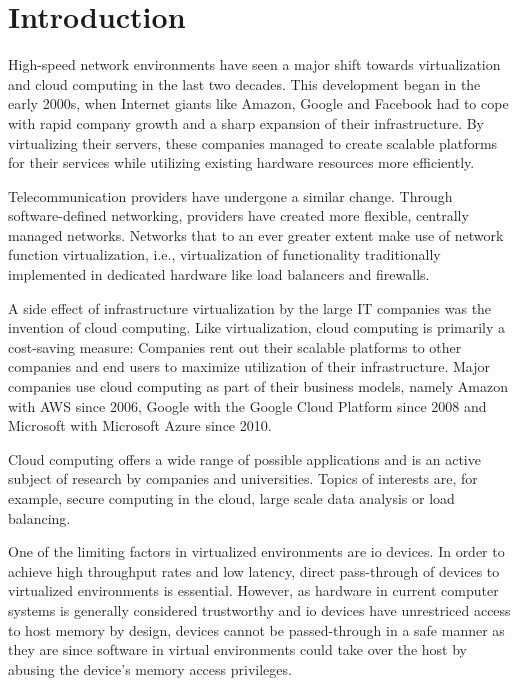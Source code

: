 \chapter{Introduction}
\label{chap:introduction}

High-speed network environments have seen a major shift towards virtualization
and cloud computing in the last two decades. This development began in the early
2000s, when Internet giants like Amazon, Google and Facebook had to cope with
rapid company growth and a sharp expansion of their infrastructure. By
virtualizing their servers, these companies managed to create scalable platforms
for their services while utilizing existing hardware resources more efficiently.

Telecommunication providers have undergone a similar change. Through
software-defined networking, providers have created more flexible, centrally
managed networks. Networks that to an ever greater extent make use of network
function virtualization, i.e., virtualization of functionality traditionally
implemented in dedicated hardware like load balancers and firewalls.

A side effect of infrastructure virtualization by the large IT companies was the
invention of cloud computing. Like virtualization, cloud computing is primarily
a cost-saving measure: Companies rent out their scalable platforms to other
companies and end users to maximize utilization of their infrastructure. Major
companies use cloud computing as part of their business models, namely Amazon
with AWS since 2006, Google with the Google Cloud Platform since 2008 and
Microsoft with Microsoft Azure since 2010.

Cloud computing offers a wide range of possible applications and is an active
subject of research by companies and universities. Topics of interests are, for
example, secure computing in the cloud, large scale data analysis or load
balancing.

One of the limiting factors in virtualized environments are \acs{io} devices. In
order to achieve high throughput rates and low latency, direct pass-through of
devices to virtualized environments is essential. However, as hardware in
current computer systems is generally considered trustworthy and \ac{io} devices
have unrestriced access to host memory by design, devices cannot be
passed-through in a safe manner as they are since software in virtual
environments could take over the host by abusing the device's memory access
privileges.

